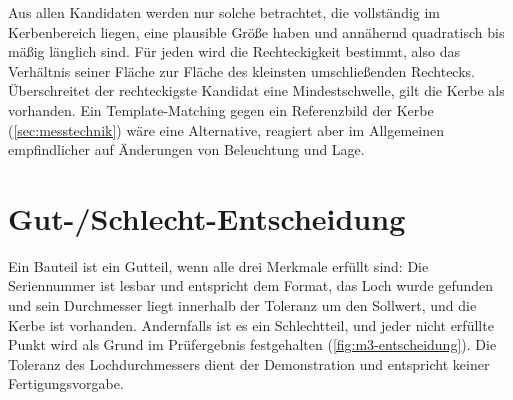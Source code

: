 Aus allen Kandidaten werden nur solche betrachtet, die vollständig im Kerbenbereich liegen,
eine plausible Größe haben und annähernd quadratisch bis mäßig länglich sind. Für jeden wird
die Rechteckigkeit bestimmt, also das Verhältnis seiner Fläche zur Fläche des kleinsten
umschließenden Rechtecks. Überschreitet der rechteckigste Kandidat eine Mindestschwelle, gilt
die Kerbe als vorhanden. Ein Template-Matching gegen ein Referenzbild der Kerbe
(\cref{sec:messtechnik}) wäre eine Alternative, reagiert aber im Allgemeinen empfindlicher
auf Änderungen von Beleuchtung und Lage.

\section{Gut-/Schlecht-Entscheidung}
\label{sec:m3-entscheidung}

Ein Bauteil ist ein Gutteil, wenn alle drei Merkmale erfüllt sind: Die Seriennummer ist
lesbar und entspricht dem Format, das Loch wurde gefunden und sein Durchmesser liegt innerhalb
der Toleranz um den Sollwert, und die Kerbe ist vorhanden. Andernfalls ist es ein Schlechtteil,
und jeder nicht erfüllte Punkt wird als Grund im Prüfergebnis festgehalten
(\cref{fig:m3-entscheidung}). Die Toleranz des Lochdurchmessers dient der Demonstration und
entspricht keiner Fertigungsvorgabe.

